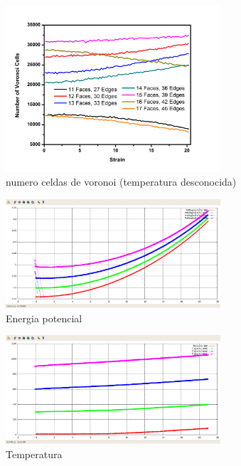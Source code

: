 \documentclass[10pt, oneside]{article} %
\begin{document}
\begin{figure}[H]
\centering
\includegraphics[width=8cm]{Figures/COMP_Num_Step.png}
\caption{numero celdas de voronoi (temperatura desconocida)}
\end{figure}

\begin{figure}[H]
\centering
\includegraphics[width=8cm]{Figures/EngPot_COMP.png}
\caption{Energia potencial}
\end{figure}

\begin{figure}[H]
\centering
\includegraphics[width=8cm]{Figures/Temp_COMP.png}
\caption{Temperatura}
\end{figure}
\end{document}
